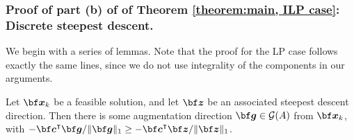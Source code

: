 \documentclass[moor]{informs1hack}              %
\def\Graver{{\mathcal G}}
\def\ve#1{\mathchoice{\mbox{\boldmath$\displaystyle\bf#1$}}
{\mbox{\boldmath$\textstyle\bf#1$}}
{\mbox{\boldmath$\scriptstyle\bf#1$}}
{\mbox{\boldmath$\scriptscriptstyle\bf#1$}}}
\newcommand\vecc{{\ve c}}
\newcommand\veg{{\ve g}}
\newcommand\vex{{\ve x}}
\newcommand\vez{{\ve z}}
\newcommand{\T}{{\intercal}} %
\begin{document}


\subsubsection{Proof of part (b) of of Theorem \ref{theorem:main, ILP case}: Discrete steepest descent.}

We begin with a series of lemmas. Note that the proof for the LP case follows exactly the same lines, since we do not use integrality of the components in our arguments.

\begin{lemma}\label{Lemma: Steepest descent direction is in G(A)}
  Let $\vex_k$ be a feasible solution, and let $\vez$ be an associated  steepest \-descent direction. Then there is some augmentation direction $\veg\in\Graver(A)$ from $\vex_k$, with $-\vecc^\T\veg / \|\veg\|_1 \geq -\vecc^\T\vez/\|\vez\|_1$.
\end{lemma}
\end{document}
